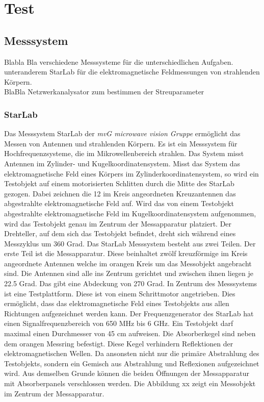 \newpage
\section{Test}
\subsection{Messsystem}
Blabla Bla verschiedene Messsysteme für die unterschiedlichen Aufgaben.\\
unteranderem  StarLab für die elektromagnetische Feldmessungen von strahlenden Körpern.\\

BlaBla Netzwerkanalysator zum bestimmen der Streuparameter
\subsubsection{StarLab}
Das Messsystem  StarLab der \textit{mvG microwave vision Gruppe} ermöglicht das Messen von Antennen und strahlenden Körpern. Es ist ein Messsystem für Hochfrequenzsysteme, die im Mikrowellenbereich strahlen. Das System misst Antennen im Zylinder- und Kugelkoordinatensystem. Misst das System das elektromagnetische Feld eines Körpers im Zylinderkoordinatensystem, so wird ein Testobjekt auf einem motorisierten Schlitten durch die Mitte des StarLab gezogen. Dabei zeichnen die 12 im Kreis angeordneten Kreuzantennen das abgestrahlte elektromagnetische Feld auf. 
Wird das von einem Testobjekt abgestrahlte elektromagnetische Feld im Kugelkoordinatensystem aufgenommen, wird das Testobjekt genau im Zentrum der Messapparatur platziert. Der Drehteller, auf dem sich das Testobjekt befindet, dreht sich während eines Messzyklus um 360 Grad. 
Das StarLab Messsystem besteht aus  zwei Teilen. Der erste Teil ist die Messapparatur. Diese beinhaltet zwölf kreuzförmige im Kreis angeordnete Antennen welche im orangen Kreis um das Messobjekt angebracht sind.  Die Antennen sind alle ins Zentrum gerichtet und zwischen ihnen liegen je 22.5 Grad. Das gibt eine Abdeckung von 270 Grad. In Zentrum des Messsystems ist eine Testplattform. Diese ist von einem Schrittmotor angetrieben. Dies ermöglicht, dass das elektromagnetische Feld eines Testobjekts aus allen Richtungen aufgezeichnet werden kann. Der Frequenzgenerator des StarLab hat einen Signalfrequenzbereich von 650 MHz bis 6 GHz. Ein Testobjekt darf maximal einen Durchmesser von 45 cm aufweisen.
Die Absorberkegel sind neben dem orangen Messring befestigt. Diese Kegel verhindern Reflektionen der elektromagnetischen Wellen. Da ansonsten nicht nur die primäre Abstrahlung des Testobjekts, sondern ein Gemisch aus Abstrahlung und Reflexionen aufgezeichnet wird. Aus demselben Grunde können die beiden Öffnungen der Messapparatur mit Absorberpanels verschlossen werden. Die Abbildung xx zeigt ein Messobjekt im Zentrum der Messapparatur. 

